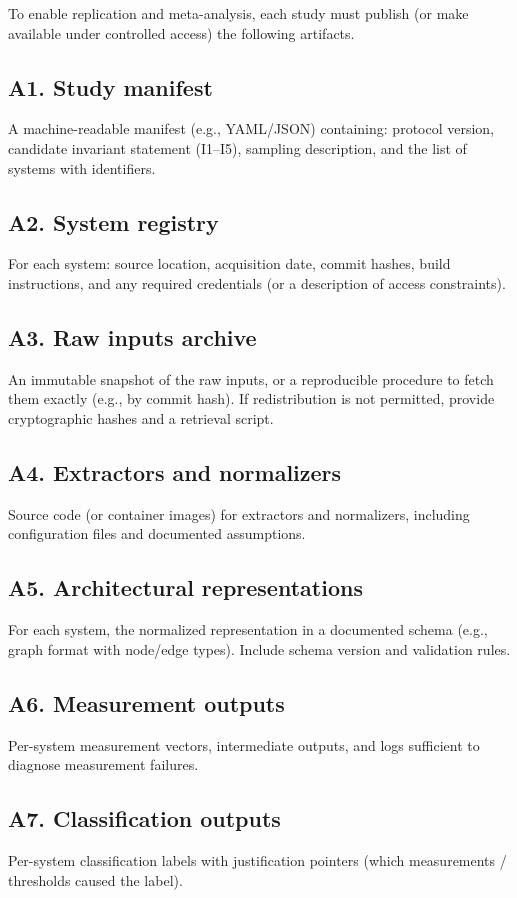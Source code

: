 To enable replication and meta-analysis, each study must publish (or make available under controlled access) the following artifacts.

\subsection*{A1. Study manifest}
A machine-readable manifest (e.g., YAML/JSON) containing: protocol version, candidate invariant statement (I1--I5), sampling description, and the list of systems with identifiers.

\subsection*{A2. System registry}
For each system: source location, acquisition date, commit hashes, build instructions, and any required credentials (or a description of access constraints).

\subsection*{A3. Raw inputs archive}
An immutable snapshot of the raw inputs, or a reproducible procedure to fetch them exactly (e.g., by commit hash). If redistribution is not permitted, provide cryptographic hashes and a retrieval script.

\subsection*{A4. Extractors and normalizers}
Source code (or container images) for extractors and normalizers, including configuration files and documented assumptions.

\subsection*{A5. Architectural representations}
For each system, the normalized representation in a documented schema (e.g., graph format with node/edge types). Include schema version and validation rules.

\subsection*{A6. Measurement outputs}
Per-system measurement vectors, intermediate outputs, and logs sufficient to diagnose measurement failures.

\subsection*{A7. Classification outputs}
Per-system classification labels with justification pointers (which measurements / thresholds caused the label).

